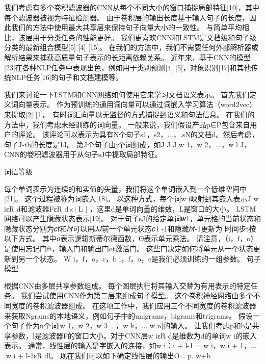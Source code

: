 \documentclass[a4paper,AutoFakeBold,oneside,12pt]{book}
\begin{document}
我们考虑有多个卷积滤波器的CNN从每个不同大小的窗口捕捉局部特征[10]，其中每个滤波器被视为特征检测器。 由于卷积层的输出长度基于输入句子的长度，因此我们的方法中使用最大共享层来保持句子向量大小的一致性。 与简单平均相比，该层用于分类任务的性能更好。 我们更喜欢CNN和LSTM是文档级和句子级分类的最新组合模型[5] [4] [15]。 在我们的方法中，我们不需要任何外部解析器或解析结果来捕获高质量句子表示的长距离依赖关系。 近年来，基于CNN的模型[23]在各种NLP任务中表现出色，例如用于类别预测[4] [5]，对象识别[17]和其他传统NLP任务[16]的句子和文档建模等。

我们来讨论一下LSTM和CNN网络如何使用它来学习文档语义表示。 首先我们定义词向量表示。 作为预训练的通用词向量可以通过词嵌入学习算法（word2vec）来提取[2] [1]。 有时词汇向量以无监督的方式捕捉到语义和句法信息。 在我们的方法中，我们考虑未经训练的词向量。 一般来说，我们假设产品p∈P包含来自用户的评论。 该评论可以表示为具有N个句子{s1，s2，...，.sN}的文档d。然后考虑，句子J-th的长度是1J。 第J个句子由j个词组成，如J J J {w 1，w 2，...，w l J}，CNN的卷积滤波器用于从句子sJ中提取局部特征。

词语等级

每个单词表示为连续的和实值的矢量，我们将这个单词嵌入到一个低维空间中[21]。 这个过程被称为词嵌入[18]。 以这种方式，每个词w i映射到其嵌入表示J w iεR d和滤波器FεR d×| L | ，这里d是单词向量的维数，L是窗口的大小。
LSTM网络可以产生隐藏状态表示[19]。 对于句子sJ的给定单词𝑤1，单元格的当前状态和隐藏状态分别为𝑐𝑡和ℎ𝑡可以用𝐽𝐽前一个单元状态𝑐1 -1和隐藏ℎ𝑡-1更新为 时间步t按以下方式。
其中σ表示逻辑斯蒂尔德函数，ʘ表示单元乘法。 请注意，（i，f，o）是使用忘记门ft，输入门和输出门ot激活门。 这些门决定如何将单元从一个状态更新到另一个状态。 W {i，f，o，c}，b {i，f，o，c}是我们必须训练的一组参数。
句子模型



根据CNN由多层共享参数组成。 每个图层执行将其输入交替为有用表示的特定任务。 我们尝试使用CNN作为第二层来组成句子模型。 这个卷积神经网络由多个不同宽度的卷积滤波器组成。 在这项工作中，我们应用三个不同宽度的卷积滤波器来获取Ngrams的本地语义，例如句子中的unigrams，bigrams和trigrams。 假设一个句子作为n个词[w 1，w 2，w 3 ...，w k，... w n]的输入。 让我们考虑p和b是共享参数，l是滤波器F的窗口大小。对于CNN层w iεR d是维数为d的单词w i的嵌入表示。 通常，线性层的输入是字嵌入的连接，如w i：i + l-1 = {w i，w i + 1，... .w i + l-1}εR dl。 现在我们可以如下确定线性层的输出O= p. w+b
\end{document}
